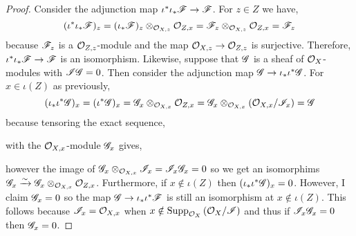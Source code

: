 \documentclass[12pt]{article}
\begin{document}
\begin{proof}
Consider the adjunction map $\iota^* \iota_* \mathscr{F} \to \mathscr{F}$. For $z \in Z$ we have,
\[ (\iota^* \iota_* \mathscr{F})_z = (\iota_* \mathscr{F})_z \otimes_{\mathcal{O}_{X, z}} \mathcal{O}_{Z, x} = \mathscr{F}_z \otimes_{\mathcal{O}_{X, z}} \mathcal{O}_{Z, x} = \mathscr{F}_z \]
because $\mathscr{F}_z$ is a $\mathcal{O}_{Z, z}$-module and the map $\mathcal{O}_{X, z} \to \mathcal{O}_{Z, z}$ is surjective. Therefore, $\iota^* \iota_* \mathscr{F} \to \mathscr{F}$ is an isomorphism. Likewise, suppose that $\mathscr{G}$ is a sheaf of $\mathcal{O}_{X}$-modules with $\mathscr{I} \mathscr{G} = 0$. Then consider the adjunction map $\mathscr{G} \to \iota_* \iota^* \mathscr{G}$. For $x \in \iota(Z)$ as previously,
\[ (\iota_* \iota^* \mathscr{G})_x = (\iota^* \mathscr{G})_x = \mathscr{G}_x \otimes_{\mathcal{O}_{X, x}} \mathcal{O}_{Z, x} = \mathscr{G}_x \otimes_{\mathcal{O}_{X, x}} (\mathcal{O}_{X, x} / \mathscr{I}_x) = \mathscr{G} \]
because tensoring the exact sequence,
\begin{center}
\end{center}
with the $\mathcal{O}_{X, x}$-module $\mathscr{G}_x$ gives,
\begin{center}
\end{center}
however the image of $\mathscr{G}_x \otimes_{\mathcal{O}_{X, x}} \mathscr{I}_x = \mathscr{I}_x \mathscr{G}_x = 0$ so we get an isomorphims $\mathscr{G}_x \xrightarrow{\sim} \mathscr{G}_x \otimes_{\mathcal{O}_{X, x}} \mathcal{O}_{Z, x}$. Furthermore, if $x \notin \iota(Z)$ then $(\iota_* \iota^* \mathscr{G})_x = 0$. However, I claim $\mathscr{G}_x = 0$ so the map $\mathscr{G} \to \iota_* \iota^* \mathscr{F}$ is still an isomorphism at $x \notin \iota(Z)$. This follows because $\mathscr{I}_x = \mathcal{O}_{X, x}$ when $x \notin \mathrm{Supp}_{\mathcal{O}_{X}}\left(\mathcal{O}_{X}/\mathscr{I} \right)$ and thus if $\mathscr{I}_x \mathscr{G}_x = 0$ then $\mathscr{G}_x = 0$. 
\end{proof}
\end{document}
